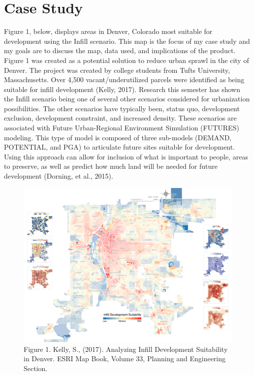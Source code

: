 \documentclass[20pt]{article}
\begin{document}
\section{Case Study}
Figure 1, below, displays areas in Denver, Colorado most suitable for development using the Infill scenario. This map is the focus of my case study and my goals are to discuss the map, data used, and implications of the product. Figure 1 was created as a potential solution to reduce urban sprawl in the city of Denver. The project was created by college students from Tufts University, Massachusetts. Over 4,500 vacant/underutilized parcels were identified as being suitable for infill development (Kelly, 2017). Research this semester has shown the Infill scenario being one of several other scenarios considered for urbanization possibilities. The other scenarios have typically been, status quo, development exclusion, development constraint, and increased density. These scenarios are associated with Future Urban-Regional Environment Simulation (FUTURES) modeling. This type of model is composed of three sub-models (DEMAND, POTENTIAL, and PGA) to articulate future sites suitable for development. Using this approach can allow for inclusion of what is important to people, areas to preserve, as well as predict how much land will be needed for future development (Dorning, et al., 2015).
\begin{figure}[htp]
\centering
\includegraphics[width=\textwidth]{Figure 1.png}
\caption{Figure 1. Kelly, S., (2017). Analyzing Infill Development Suitability in Denver. ESRI Map Book, Volume 33, Planning and Engineering Section.}
\label{fig:Development Sustainability}
\end{figure}
\end{document}
